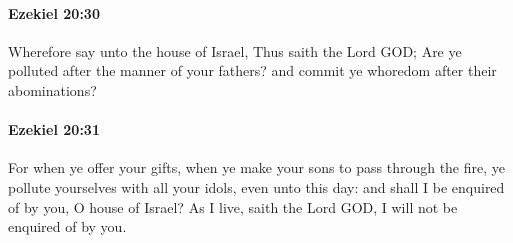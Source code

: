 		\paragraph{Ezekiel 20:30} %
			\label{EZEKIEL-20-30}

			Wherefore say unto the house of Israel, Thus saith the Lord GOD; Are ye polluted after the manner of your fathers? and commit ye whoredom after their abominations?


		\paragraph{Ezekiel 20:31} %
			\label{EZEKIEL-20-31}

			For when ye offer your gifts, when ye make your sons to pass through the fire, ye pollute yourselves with all your idols, even unto this day: and shall I be enquired of by you, O house of Israel? As I live, saith the Lord GOD, I will not be enquired of by you.


